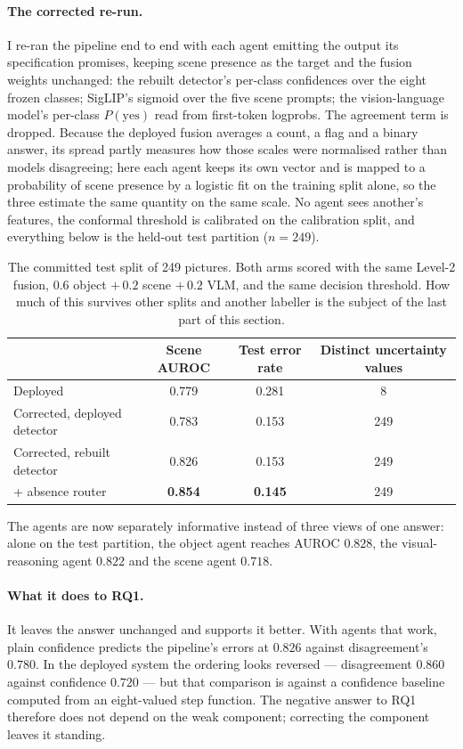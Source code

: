 \documentclass[11pt,a4paper]{article}
\begin{document}
\paragraph{The corrected re-run.} I re-ran the pipeline end to end with each agent emitting the output
its specification promises, keeping scene presence as the target and the fusion weights unchanged:
the rebuilt detector's per-class confidences over the eight frozen classes; SigLIP's sigmoid over the
five scene prompts; the vision-language model's per-class $P(\text{yes})$ read from first-token
logprobs. The agreement term is dropped. Because the deployed fusion averages a count, a flag and a
binary answer, its spread partly measures how those scales were normalised rather than models
disagreeing; here each agent keeps its own vector and is mapped to a probability of scene presence by
a logistic fit on the training split alone, so the three estimate the same quantity on the same scale.
No agent sees another's features, the conformal threshold is calibrated on the calibration split, and
everything below is the held-out test partition ($n=249$).

\begin{table}[h]
\centering
\small
\begin{tabular}{lccc}
\toprule
 & Scene AUROC & Test error rate & Distinct uncertainty values \\
\midrule
Deployed & 0.779 & 0.281 & 8 \\
Corrected, deployed detector & 0.783 & 0.153 & 249 \\
Corrected, rebuilt detector & 0.826 & 0.153 & 249 \\
\quad + absence router & \textbf{0.854} & \textbf{0.145} & 249 \\
\bottomrule
\end{tabular}
\caption{The committed test split of 249 pictures. Both arms scored with the same Level-2 fusion,
$0.6$ object $+\,0.2$ scene $+\,0.2$ VLM, and the same decision threshold. How much of this survives
other splits and another labeller is the subject of the last part of this section.}
\end{table}

The agents are now separately informative instead of three views of one answer: alone on the test
partition, the object agent reaches AUROC $0.828$, the visual-reasoning agent $0.822$ and the scene
agent $0.718$.

\paragraph{What it does to RQ1.} It leaves the answer unchanged and supports it better. With agents
that work, plain confidence predicts the pipeline's errors at $0.826$ against disagreement's $0.780$.
In the deployed system the ordering looks reversed --- disagreement $0.860$ against confidence
$0.720$ --- but that comparison is against a confidence baseline computed from an eight-valued step
function. The negative answer to RQ1 therefore does not depend on the weak component; correcting the
component leaves it standing.
\end{document}
